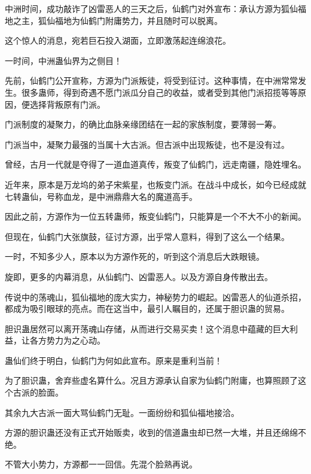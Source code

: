 
\begin{this_body}



中洲时间，成功敲诈了凶雷恶人的三天之后，仙鹤门对外宣布：承认方源为狐仙福地之主，狐仙福地为仙鹤门附庸势力，并且随时可以脱离。

这个惊人的消息，宛若巨石投入湖面，立即激荡起连绵浪花。

一时间，中洲蛊仙界为之侧目！

先前，仙鹤门公开宣称，方源为门派叛徒，将受到征讨。这种事情，在中洲常常发生。很多蛊师，得到奇遇不愿门派瓜分自己的收益，或者受到其他门派招揽等等原因，便选择背叛原有门派。

门派制度的凝聚力，的确比血脉亲缘团结在一起的家族制度，要薄弱一筹。

门派当中，凝聚力最强的当属十大古派。但古派中出现叛徒，也不是没有过。

曾经，古月一代就是夺得了一道血道真传，叛变了仙鹤门，远走南疆，隐姓埋名。

近年来，原本是万龙坞的弟子宋紫星，也叛变门派。在战斗中成长，如今已经成就七转蛊仙，号称血龙，是中洲鼎鼎大名的魔道高手。

因此之前，方源作为一位五转蛊师，叛变仙鹤门，只能算是一个不大不小的新闻。

但现在，仙鹤门大张旗鼓，征讨方源，出乎常人意料，得到了这么一个结果。

一时，不知多少人，原本以为方源作死的，听到这个消息后大跌眼镜。

旋即，更多的内幕消息，从仙鹤门、凶雷恶人。以及方源自身传散出去。

传说中的荡魂山，狐仙福地的庞大实力，神秘势力的崛起。凶雷恶人的仙道杀招，都成为吸引眼球的亮点。而在这当中，最引人瞩目的，还属于胆识蛊的贸易。

胆识蛊居然可以离开荡魂山存储，从而进行交易买卖！这个消息中蕴藏的巨大利益，让各方势力为之心动。

蛊仙们终于明白，仙鹤门为何如此宣布。原来是重利当前！

为了胆识蛊，舍弃些虚名算什么。况且方源承认自家为仙鹤门附庸，也算照顾了这个古派的脸面。

其余九大古派一面大骂仙鹤门无耻。一面纷纷和狐仙福地接洽。

方源的胆识蛊还没有正式开始贩卖，收到的信道蛊虫却已然一大堆，并且还绵绵不绝。

不管大小势力，方源都一一回信。先混个脸熟再说。


\end{this_body}
